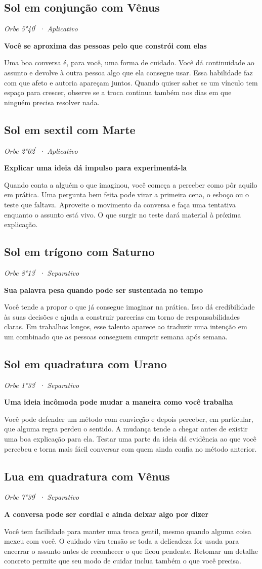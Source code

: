 \documentclass[11pt,a4paper]{article}
\newcommand{\leitura}[3]{\subsection{#1}\textit{#2}\par #3}
\newcommand{\subtituloleitura}[1]{\textbf{#1}\par\nopagebreak[4]}
\begin{document}
\leitura{Sol em conjunção com Vênus}{Orbe 5°40\ensuremath{^{\prime}} · Aplicativo}{
\label{aspecto:sol-venus}\subtituloleitura{Você se aproxima das pessoas pelo que constrói com elas}
Uma boa conversa é, para você, uma forma de cuidado. Você dá continuidade ao assunto e devolve à outra pessoa algo que ela consegue usar. Essa habilidade faz com que afeto e autoria apareçam juntos. Quando quiser saber se um vínculo tem espaço para crescer, observe se a troca continua também nos dias em que ninguém precisa resolver nada.
}

\leitura{Sol em sextil com Marte}{Orbe 2°02\ensuremath{^{\prime}} · Aplicativo}{
\label{aspecto:sol-marte}\subtituloleitura{Explicar uma ideia dá impulso para experimentá-la}
Quando conta a alguém o que imaginou, você começa a perceber como pôr aquilo em prática. Uma pergunta bem feita pode virar a primeira cena, o esboço ou o teste que faltava. Aproveite o movimento da conversa e faça uma tentativa enquanto o assunto está vivo. O que surgir no teste dará material à próxima explicação.
}

\leitura{Sol em trígono com Saturno}{Orbe 8°13\ensuremath{^{\prime}} · Separativo}{
\subtituloleitura{Sua palavra pesa quando pode ser sustentada no tempo}
Você tende a propor o que já consegue imaginar na prática. Isso dá credibilidade às suas decisões e ajuda a construir parcerias em torno de responsabilidades claras. Em trabalhos longos, esse talento aparece ao traduzir uma intenção em um combinado que as pessoas conseguem cumprir semana após semana.
}

\leitura{Sol em quadratura com Urano}{Orbe 1°33\ensuremath{^{\prime}} · Separativo}{
\label{aspecto:sol-urano}\subtituloleitura{Uma ideia incômoda pode mudar a maneira como você trabalha}
Você pode defender um método com convicção e depois perceber, em particular, que alguma regra perdeu o sentido. A mudança tende a chegar antes de existir uma boa explicação para ela. Testar uma parte da ideia dá evidência ao que você percebeu e torna mais fácil conversar com quem ainda confia no método anterior.
}

\leitura{Lua em quadratura com Vênus}{Orbe 7°39\ensuremath{^{\prime}} · Separativo}{
\label{aspecto:lua-venus}\subtituloleitura{A conversa pode ser cordial e ainda deixar algo por dizer}
Você tem facilidade para manter uma troca gentil, mesmo quando alguma coisa mexeu com você. O cuidado vira tensão se toda a delicadeza for usada para encerrar o assunto antes de reconhecer o que ficou pendente. Retomar um detalhe concreto permite que seu modo de cuidar inclua também o que você precisa.
}
\end{document}
